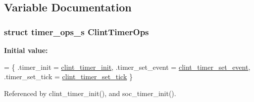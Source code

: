 \subsection{Variable Documentation}
\hypertarget{clint-timer_8c_ac6de9c7f0557ed4f63e96d7b02123a00}{
\subsubsection[{Clint\-Timer\-Ops}]{\setlength{\rightskip}{0pt plus 5cm}struct {\bf timer\-\_\-ops\-\_\-s} Clint\-Timer\-Ops}}\label{clint-timer_8c_ac6de9c7f0557ed4f63e96d7b02123a00}
{\bfseries Initial value\-:}
\begin{DoxyCode}
= \{
    .timer\_init = \hyperlink{clint-timer_8c_ac30a676af29cbb246c9108869470323c}{clint\_timer\_init},
    .timer\_set\_event = \hyperlink{clint-timer_8c_a249a319ccbd6471ab60e1a40f1423321}{clint\_timer\_set\_event},
    .timer\_set\_tick = \hyperlink{clint-timer_8c_ab787b81c06c064352fdba1152ef5efcb}{clint\_timer\_set\_tick}
\}
\end{DoxyCode}


Referenced by clint\-\_\-timer\-\_\-init(), and soc\-\_\-timer\-\_\-init().

